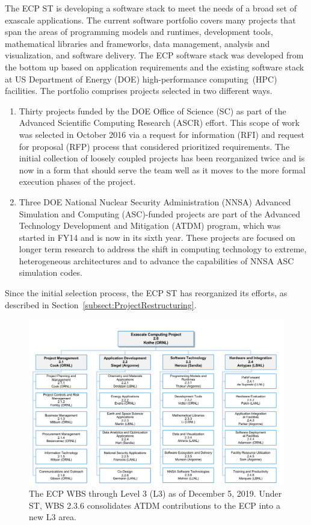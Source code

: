 The ECP ST is developing a software stack to meet the needs of a broad set of exascale applications. The current software portfolio covers many projects that span the areas of programming models and runtimes, development tools, mathematical libraries and frameworks, data management, analysis and visualization, and software delivery. The ECP software stack was developed from the bottom up based on application requirements and the existing software stack at US Department of Energy (DOE) high-performance computing~(HPC) facilities. The portfolio comprises projects selected in two different ways.
\begin{enumerate}
\item Thirty projects funded by the DOE Office of Science (SC) as part of the Advanced Scientific Computing Research (ASCR) effort.  This scope of work was selected in October 2016 via a request for information (RFI) and request for proposal (RFP) process that considered prioritized requirements. The initial collection of loosely coupled projects has been reorganized twice and is now in a form that should serve the team well as it moves to the more formal execution phases of the project.
\item Three DOE National Nuclear Security Administration (NNSA) Advanced Simulation and Computing (ASC)-funded projects are part of the Advanced Technology Development and Mitigation (ATDM) program, which was started in FY14 and is now in its sixth year. These projects are focused on longer term research to address the shift in computing technology to extreme, heterogeneous architectures and to advance the capabilities of NNSA ASC simulation codes. 
\end{enumerate}
Since the initial selection process, the ECP ST has reorganized its efforts, as described in Section~\ref{subsect:ProjectRestructuring}.

\begin{figure}
	\centering
	\includegraphics[width=0.9\linewidth]{ECP22}
	\caption{The ECP WBS through Level 3 (L3) as of December 5, 2019. Under ST, WBS 2.3.6 consolidates ATDM contributions to the ECP into a new L3 area.}
	\protect{}
	\label{fig:ecp2}
\end{figure}

